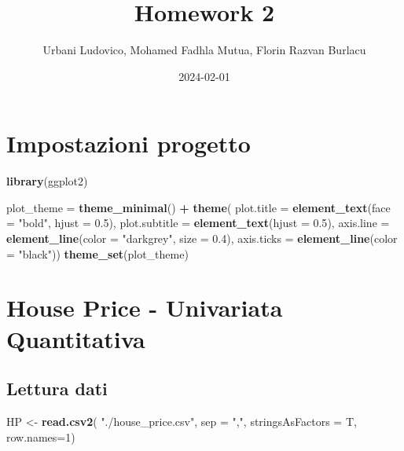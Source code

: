 \documentclass[
]{article}
\title{Homework 2}
\author{Urbani Ludovico, Mohamed Fadhla Mutua, Florin Razvan Burlacu}
\date{2024-02-01}
\newenvironment{Shaded}{\begin{snugshade}}{\end{snugshade}}
\newcommand{\AttributeTok}[1]{\textcolor[rgb]{0.13,0.29,0.53}{#1}}
\newcommand{\DecValTok}[1]{\textcolor[rgb]{0.00,0.00,0.81}{#1}}
\newcommand{\FloatTok}[1]{\textcolor[rgb]{0.00,0.00,0.81}{#1}}
\newcommand{\FunctionTok}[1]{\textcolor[rgb]{0.13,0.29,0.53}{\textbf{#1}}}
\newcommand{\NormalTok}[1]{#1}
\newcommand{\OtherTok}[1]{\textcolor[rgb]{0.56,0.35,0.01}{#1}}
\newcommand{\SpecialCharTok}[1]{\textcolor[rgb]{0.81,0.36,0.00}{\textbf{#1}}}
\newcommand{\StringTok}[1]{\textcolor[rgb]{0.31,0.60,0.02}{#1}}
\begin{document}
\maketitle

\section{Impostazioni progetto}\label{impostazioni-progetto}

\begin{Shaded}
\begin{Highlighting}[]
\FunctionTok{library}\NormalTok{(ggplot2)}

\NormalTok{plot\_theme }\OtherTok{=} \FunctionTok{theme\_minimal}\NormalTok{() }\SpecialCharTok{+}
    \FunctionTok{theme}\NormalTok{(}
        \AttributeTok{plot.title =} \FunctionTok{element\_text}\NormalTok{(}\AttributeTok{face =} \StringTok{"bold"}\NormalTok{, }\AttributeTok{hjust =} \FloatTok{0.5}\NormalTok{),}
        \AttributeTok{plot.subtitle =} \FunctionTok{element\_text}\NormalTok{(}\AttributeTok{hjust =} \FloatTok{0.5}\NormalTok{),}
        \AttributeTok{axis.line =} \FunctionTok{element\_line}\NormalTok{(}\AttributeTok{color =} \StringTok{"darkgrey"}\NormalTok{, }\AttributeTok{size =} \FloatTok{0.4}\NormalTok{),}
        \AttributeTok{axis.ticks =} \FunctionTok{element\_line}\NormalTok{(}\AttributeTok{color =} \StringTok{"black"}\NormalTok{))}
\FunctionTok{theme\_set}\NormalTok{(plot\_theme)}
\end{Highlighting}
\end{Shaded}

\section{House Price - Univariata
Quantitativa}\label{house-price---univariata-quantitativa}

\subsection{Lettura dati}\label{lettura-dati}

\begin{Shaded}
\begin{Highlighting}[]
\NormalTok{HP }\OtherTok{\textless{}{-}} \FunctionTok{read.csv2}\NormalTok{(}
    \StringTok{"./house\_price.csv"}\NormalTok{, }
    \AttributeTok{sep =} \StringTok{","}\NormalTok{, }
    \AttributeTok{stringsAsFactors =}\NormalTok{ T,}
    \AttributeTok{row.names=}\DecValTok{1}\NormalTok{)}
\end{Highlighting}
\end{Shaded}
\end{document}
